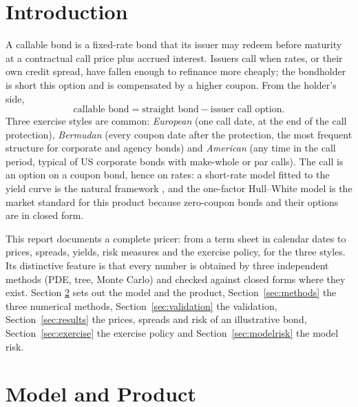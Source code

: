 \documentclass[11pt,a4paper]{article}
\begin{document}
\section{Introduction}
A callable bond is a fixed-rate bond that its issuer may redeem before maturity at a contractual call price plus
accrued interest. Issuers call when rates, or their own credit spread, have fallen enough to refinance more
cheaply; the bondholder is short this option and is compensated by a higher coupon. From the holder's side,
\begin{equation}\label{eq:decomposition}
\text{callable bond} = \text{straight bond} - \text{issuer call option}.
\end{equation}
Three exercise styles are common: \emph{European} (one call date, at the end of the call protection),
\emph{Bermudan} (every coupon date after the protection, the most frequent structure for corporate and agency
bonds) and \emph{American} (any time in the call period, typical of US corporate bonds with make-whole or par
calls). The call is an option on a coupon bond, hence on rates: a short-rate model fitted to the yield curve is the
natural framework \cite{hull1990,brigo2006,andersen2010}, and the one-factor Hull--White model is the market
standard for this product because zero-coupon bonds and their options are in closed form.

This report documents a complete pricer: from a term sheet in calendar dates to prices, spreads, yields, risk
measures and the exercise policy, for the three styles. Its distinctive feature is that every number is obtained
by three independent methods (PDE, tree, Monte Carlo) and checked against closed forms where they exist. Section
\ref{sec:model} sets out the model and the product, Section~\ref{sec:methods} the three numerical methods,
Section~\ref{sec:validation} the validation, Section~\ref{sec:results} the prices, spreads and risk of an
illustrative bond, Section~\ref{sec:exercise} the exercise policy and Section~\ref{sec:modelrisk} the model risk.

\section{Model and Product}\label{sec:model}
\end{document}
